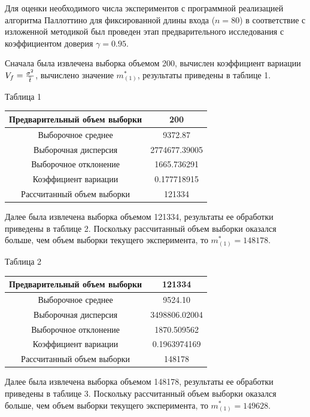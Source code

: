\documentclass[a4paper,fontsize=14pt]{article}
\begin{document}
Для оценки необходимого числа экспериментов с программной реализацией алгоритма Паллоттино для фиксированной длины входа ($n = 80$) в соответствие с изложенной методикой был проведен этап предварительного исследования с коэффициентом доверия $\gamma = 0.95$.

Сначала была извлечена выборка объемом 200, вычислен коэффициент вариации $V_f = {\sigma^2 \over{\overline{t}}}$, вычислено значение $m_{(1)}^*$, результаты приведены в таблице 1.

\begin{center}
	\label{table1}
	Таблица 1 \\
	\hfill \break
	\begin{tabular}{|c|c|}
		\hline
		Предварительный объем выборки & 200 \\
		\hline
		Выборочное среднее & 9372.87 \\
		\hline
		Выборочная дисперсия & 2774677.39005 \\
		\hline
		Выборочное отклонение & 1665.736291 \\
		\hline
		Коэффициент вариации & 0.177718915 \\
		\hline
		Рассчитанный объем выборки & 121334 \\
		\hline
	\end{tabular}
\end{center}

Далее была извлечена выборка объемом 121334, результаты ее обработки приведены в таблице 2. Поскольку рассчитанный объем выборки оказался больше, чем объем выборки текущего эксперимента, то $m_{(1)}^* = 148178$.

\begin{center}
	\label{table2}
	Таблица 2 \\
	\hfill \break
	\begin{tabular}{|c|c|}
		\hline
		Предварительный объем выборки & 121334 \\
		\hline
		Выборочное среднее & 9524.10 \\
		\hline
		Выборочная дисперсия & 3498806.02004 \\
		\hline
		Выборочное отклонение & 1870.509562 \\
		\hline
		Коэффициент вариации & 0.1963974169 \\
		\hline
		Рассчитанный объем выборки & 148178 \\
		\hline
	\end{tabular}
\end{center}

Далее была извлечена выборка объемом 148178, результаты ее обработки приведены в таблице 3. Поскольку рассчитанный объем выборки оказался больше, чем объем выборки текущего эксперимента, то $m_{(1)}^* = 149628$.
\end{document}

